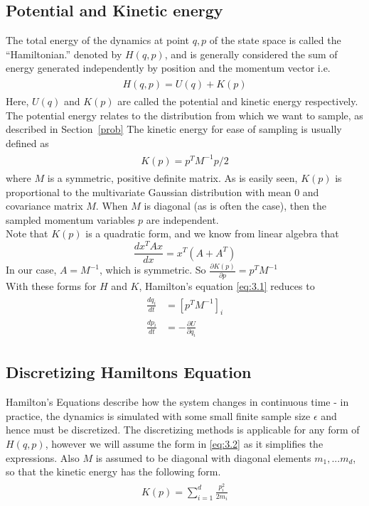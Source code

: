 \documentclass{article}
\numberwithin{equation}{section}
\begin{document}
\subsection{Potential and Kinetic energy}
The total energy of the dynamics at point $q,p$ of the state space is called the ``Hamiltonian.'' denoted by $H(q,p)$, and is generally considered the sum of energy generated independently by position and the momentum vector i.e.
\begin{align}
\begin{split}
H(q,p) = U(q) + K(p)
\end{split}
\label{eq:3.2}
\end{align}
Here, $U(q)$ and $K(p)$ are called the potential and kinetic energy respectively. The potential energy relates to the distribution from which we want to sample, as described in Section~\ref{prob} The kinetic energy for ease of sampling is usually defined as
\begin{align}
\begin{split}
K(p) = p^T M^{-1} p/2
\end{split}
\label{eq:3.3}
\end{align}
where $M$ is a symmetric, positive definite matrix.  As is easily seen, $K(p)$ is proportional to the multivariate Gaussian distribution with mean 0 and covariance matrix $M$. When $M$ is diagonal (as is often the case), then the sampled momentum variables $p$ are independent.\\
Note that $K(p)$ is a quadratic form, and we know from linear algebra that 
\begin{equation*}
\frac{d x^TAx}{dx} = x^T(A + A^T)
\end{equation*}
In our case, $A = M^{-1}$, which is symmetric. So $\frac{\partial K(p)}{\partial p} = p^T M^{-1}$\\

With these forms for $H$ and $K$, Hamilton's equation \ref{eq:3.1} reduces to
\begin{align}
\begin{split}
\frac{dq_i}{dt} &= [p^TM^{-1}]_i\\
\frac{dp_i}{dt} &= -\frac{\partial U}{\partial q_i}
\end{split}
\label{eq:3.4}
\end{align}

\subsection{Discretizing Hamiltons Equation} \label{disc}
Hamilton's Equations describe how the system changes in continuous time - in practice, the dynamics is simulated with some small finite sample size $\epsilon$ and hence must be discretized. The discretizing methods is applicable for any form of $H(q,p)$, however we will assume the form in \ref{eq:3.2} as it simplifies the expressions. Also $M$ is assumed to be diagonal with diagonal elements $m_1,...m_d$, so that the kinetic energy has the following form.
\begin{align}
\begin{split}
K(p) = \sum_{i=1}^d \frac{p_i^2}{2m_i}
\end{split}
\label{eq:3.6}
\end{align}
\end{document}
